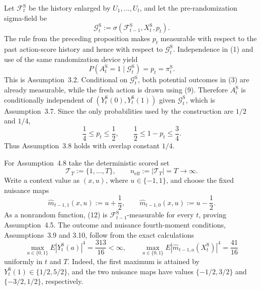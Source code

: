 Let \(\mathcal F_t^{\mathrm S}\) be the history enlarged by \(U_1,\ldots,U_t\), and let the pre-randomization sigma-field be
\[
 \mathcal G_t^{\mathrm S}
 :=\sigma(\mathcal F_{t-1}^{\mathrm S},X_t^{\mathrm S},p_t).
\tag{8}
\]
The rule from the preceding proposition makes \(p_t\) measurable with respect to the past action-score history and hence with respect to \(\mathcal G_t^{\mathrm S}\).  Independence in (1) and use of the same randomization device yield
\[
 P(A_t^{\mathrm S}=1\mid\mathcal G_t^{\mathrm S})
 =p_t=\pi_t^{\mathrm S}.
\tag{9}
\]
This is Assumption~3.2.  Conditional on \(\mathcal G_t^{\mathrm S}\), both potential outcomes in (3) are already measurable, while the fresh action is drawn using (9).  Therefore \(A_t^{\mathrm S}\) is conditionally independent of \((Y_t^{\mathrm S}(0),Y_t^{\mathrm S}(1))\) given \(\mathcal G_t^{\mathrm S}\), which is Assumption~3.7.  Since the only probabilities used by the construction are \(1/2\) and \(1/4\),
\[
 \frac14\le p_t\le\frac12,
 \qquad
 \frac12\le1-p_t\le\frac34.
\tag{10}
\]
Thus Assumption~3.8 holds with overlap constant \(1/4\).

For Assumption~4.8 take the deterministic scored set
\[
 \mathcal T_T:=\{1,\ldots,T\},
 \qquad
 n_{\mathrm{eff}}:=|\mathcal T_T|=T\longrightarrow\infty.
\tag{11}
\]
Write a context value as \((x,u)\), where \(u\in\{-1,1\}\), and choose the fixed nuisance maps
\[
 \widehat m_{t-1,1}(x,u):=u+\frac12,
 \qquad
 \widehat m_{t-1,0}(x,u):=u-\frac12.
\tag{12}
\]
As a nonrandom function, (12) is \(\mathcal F_{t-1}^{\mathrm S}\)-measurable for every \(t\), proving Assumption~4.5.  The outcome and nuisance fourth-moment conditions, Assumptions~3.9 and 3.10, follow from the exact calculations
\[
 \max_{a\in\{0,1\}}E|Y_t^{\mathrm S}(a)|^4
 =\frac{313}{16}<\infty,
 \qquad
 \max_{a\in\{0,1\}}E\!\left|\widehat m_{t-1,a}(X_t^{\mathrm S})\right|^4
 =\frac{41}{16}
\tag{13}
\]
uniformly in \(t\) and \(T\).  Indeed, the first maximum is attained by \(Y_t^{\mathrm S}(1)\in\{1/2,5/2\}\), and the two nuisance maps have values \(\{-1/2,3/2\}\) and \(\{-3/2,1/2\}\), respectively.


